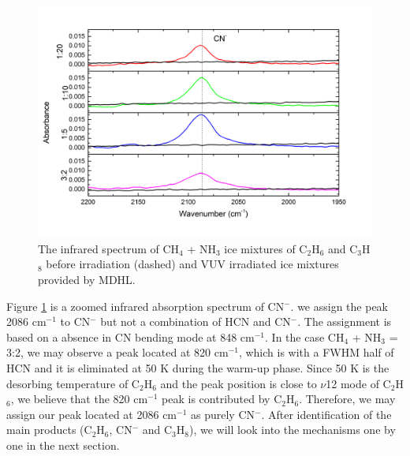\begin{figure}
\centering
\includegraphics[width=\textwidth]{figures/chapter3/CN.png}
\caption{The infrared spectrum of CH$_4$ + NH$_3$ ice mixtures of C$_2$H$_6$ and C$_3$H$_8$ before irradiation (dashed) and VUV irradiated ice mixtures provided by MDHL. }
\label{fig:CN}
\end{figure}

Figure \ref{fig:CN} is a zoomed infrared absorption spectrum of CN$^-$. we assign the peak 2086 cm$^{-1}$ to CN$^-$  but not a combination of HCN and CN$^-$. The assignment is based on a absence in CN bending mode at 848 cm$^{-1}$. In the case CH$_4$ + NH$_3$ = 3:2, we may observe a peak located at 820 cm$^{-1}$, which is with a FWHM half of HCN and it is eliminated at 50 K during the warm-up phase. Since 50 K is the desorbing temperature of C$_2$H$_6$ and the peak position is close to $\nu$12 mode of C$_2$H$_6$, we believe that the 820 cm$^{-1}$ peak is contributed by C$_2$H$_6$. Therefore, we may assign our peak located at 2086 cm$^{-1}$ as purely CN$^-$. After identification of the main products (C$_2$H$_6$, CN$^-$ and C$_3$H$_8$), we will look into the mechanisms one by one in the next section.\\

